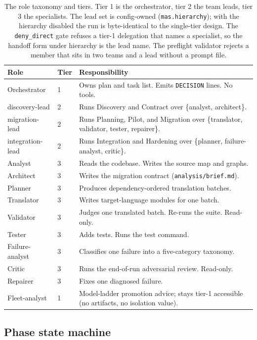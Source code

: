 \documentclass[11pt]{article}
\begin{document}
\begin{table}[ht]
\centering
\begin{tabular}{llp{7.2cm}}
\toprule
Role & Tier & Responsibility \\
\midrule
Orchestrator & 1 & Owns plan and task list. Emits \texttt{DECISION} lines. No tools. \\
discovery-lead & 2 & Runs Discovery and Contract over \{analyst, architect\}. \\
migration-lead & 2 & Runs Planning, Pilot, and Migration over \{translator, validator, tester, repairer\}. \\
integration-lead & 2 & Runs Integration and Hardening over \{planner, failure-analyst, critic\}. \\
Analyst & 3 & Reads the codebase. Writes the source map and graphs. \\
Architect & 3 & Writes the migration contract (\texttt{analysis/brief.md}). \\
Planner & 3 & Produces dependency-ordered translation batches. \\
Translator & 3 & Writes target-language modules for one batch. \\
Validator & 3 & Judges one translated batch. Re-runs the suite. Read-only. \\
Tester & 3 & Adds tests. Runs the test command. \\
Failure-analyst & 3 & Classifies one failure into a five-category taxonomy. \\
Critic & 3 & Runs the end-of-run adversarial review. Read-only. \\
Repairer & 3 & Fixes one diagnosed failure. \\
Fleet-analyst & 1 & Model-ladder promotion advice; stays tier-1 accessible (no artifacts, no isolation value). \\
\bottomrule
\end{tabular}
\caption{The role taxonomy and tiers. Tier 1 is the orchestrator, tier 2
the team leads, tier 3 the specialists. The lead set is config-owned
(\texttt{mas.hierarchy}); with the hierarchy disabled the run is
byte-identical to the single-tier design. The \texttt{deny\_direct} gate
refuses a tier-1 delegation that names a specialist, so the handoff form
under hierarchy is the lead name. The preflight validator rejects a
member that sits in two teams and a lead without a prompt file.}
\label{tab:roles}
\end{table}

\subsection{Phase state machine}
\end{document}
